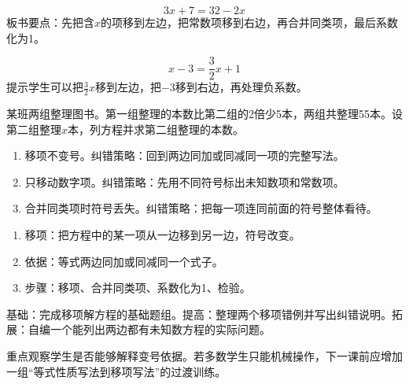 \documentclass[UTF8,a4paper,11pt]{ctexart}
\begin{document}
\[
3x+7=32-2x
\]
板书要点：先把含\(x\)的项移到左边，把常数项移到右边，再合并同类项，最后系数化为1。

\[
x-3=\frac{3}{2}x+1
\]
提示学生可以把\(\frac{3}{2}x\)移到左边，把\(-3\)移到右边，再处理负系数。

某班两组整理图书。第一组整理的本数比第二组的2倍少5本，两组共整理55本。设第二组整理\(x\)本，列方程并求第二组整理的本数。

\begin{enumerate}
\item 移项不变号。纠错策略：回到两边同加或同减同一项的完整写法。
\item 只移动数字项。纠错策略：先用不同符号标出未知数项和常数项。
\item 合并同类项时符号丢失。纠错策略：把每一项连同前面的符号整体看待。
\end{enumerate}


\begin{enumerate}
\item 移项：把方程中的某一项从一边移到另一边，符号改变。
\item 依据：等式两边同加或同减同一个式子。
\item 步骤：移项、合并同类项、系数化为1、检验。
\end{enumerate}

基础：完成移项解方程的基础题组。提高：整理两个移项错例并写出纠错说明。拓展：自编一个能列出两边都有未知数方程的实际问题。

重点观察学生是否能够解释变号依据。若多数学生只能机械操作，下一课前应增加一组“等式性质写法到移项写法”的过渡训练。
\end{document}
